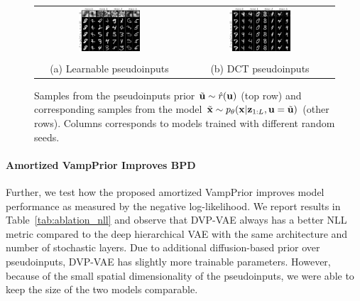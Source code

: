 \begin{figure}[t]
    \begin{tabular}{cc}
        \includegraphics[width=0.43\textwidth]{pics/5_dvp/mnist_linear_prior_samples.pdf} &
        \includegraphics[width=0.43\textwidth]{pics/5_dvp/mnist_dct_prior_samples_seed.pdf} \\ \\
        (a) Learnable pseudoinputs &
        (b) DCT pseudoinputs \\
    \end{tabular}
    \caption{Samples from the pseudoinputs prior $\Tilde{{\mathbf{u}}} \sim \hat{r}({\mathbf{u}})$ (top row) and corresponding samples from the model $\Tilde{{\mathbf{x}}} \sim p_{\theta}({\mathbf{x}}|{\mathbf{z}}_{1:L}, {\mathbf{u}}=\Tilde{{\mathbf{u}}})$ (other rows). Columns corresponds to models trained with different random seeds.}
    \label{fig:linear_context_sampels}
    \vskip 20pt
\end{figure}


\paragraph{Amortized VampPrior Improves BPD}

Further, we test how the proposed amortized VampPrior improves model performance as measured by the negative log-likelihood. We report results in Table~\ref{tab:ablation_nll} and observe that DVP-VAE always has a better NLL metric compared to the deep hierarchical VAE with the same architecture and number of stochastic layers.
Due to additional diffusion-based prior over pseudoinputs, DVP-VAE has slightly more trainable parameters. However, because of the small spatial dimensionality of the pseudoinputs, we were able to keep the size of the two models comparable. 

